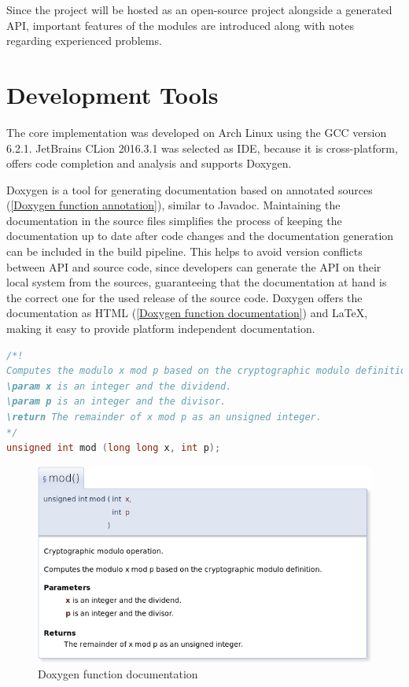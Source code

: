 Since the project will be hosted as an open-source project alongside a generated \gls{API}, important features of the modules are introduced along with notes regarding experienced problems.

\section{Development Tools}	\label{Development Tools}

The core implementation was developed on Arch Linux using the \gls{GCC} version 6.2.1. JetBrains CLion 2016.3.1 was selected as \gls{IDE}, because it is cross-platform, offers code completion and analysis and supports Doxygen.

Doxygen is a tool for generating documentation based on annotated sources (\autoref{Doxygen function annotation}), similar to Javadoc. Maintaining the documentation in the source files simplifies the process of keeping the documentation up to date after code changes and the documentation generation can be included in the build pipeline. This helps to avoid version conflicts between \gls{API} and source code, since developers can generate the \gls{API} on their local system from the sources, guaranteeing that the documentation at hand is the correct one for the used release of the source code. Doxygen offers the documentation as \gls{HTML} (\autoref{Doxygen function documentation}) and LaTeX, making it easy to provide platform independent documentation.

\begin{lstlisting}[language=C, caption={Doxygen function annotation}, label={Doxygen function annotation}]
/*!
Computes the modulo x mod p based on the cryptographic modulo definition.
\param x is an integer and the dividend.
\param p is an integer and the divisor.
\return The remainder of x mod p as an unsigned integer.
*/
unsigned int mod (long long x, int p);
\end{lstlisting}

\begin{figure}[!htbp] %
	\caption{Doxygen function documentation} \label{Doxygen function documentation}
	\includegraphics[scale=1.4]{figures/doxygen.png}
\end{figure}

